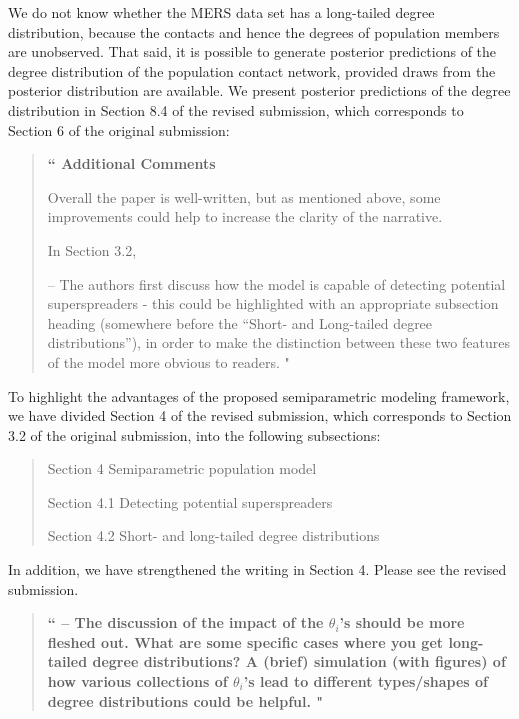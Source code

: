 \documentclass[12pt]{article}
\renewcommand{\=}{&=&}
\renewcommand{\bbq}{\vspace{.05cm}\begin{quote}\bf``}
\renewcommand{\ebq}{\hspace{-.15cm}"\end{quote}}
\newcommand{\bauthq}{\vspace{.05cm}\begin{quote}\em}
\newcommand{\eauthq}{\hspace{-.25cm}\end{quote}}
\renewcommand{\=}{&=&}
\begin{document}
We do not know whether the MERS data set has a long-tailed degree distribution,
because the contacts and hence the degrees of population members are unobserved.
That said,
it is possible to generate posterior predictions of the degree distribution of the population contact network,
provided draws from the posterior distribution are available.
We present posterior predictions of the degree distribution in Section 8.4 of the revised submission,
which corresponds to Section 6 of the original submission:
\bauthq\eauthq

\vspace{-.25cm}

\bbq
Additional Comments

Overall the paper is well-written, but as mentioned above, some improvements could help to increase the clarity of the narrative.

In Section 3.2,

– The authors first discuss how the model is capable of detecting potential superspreaders - this could be highlighted with an appropriate subsection heading (somewhere before the “Short- and Long-tailed degree distributions”), in order to make the distinction between these two features of the model more obvious to readers.
\ebq

To highlight the advantages of the proposed semiparametric modeling framework,
we have divided Section 4 of the revised submission,
which corresponds to Section 3.2 of the original submission,
into the following subsections:
\bauthq
\bi
\item[] Section 4 Semiparametric population model
\bi
\item[] Section 4.1 Detecting potential superspreaders
\item[] Section 4.2 Short- and long-tailed degree distributions
\ei
\ei
\eauthq
In addition, 
we have strengthened the writing in Section 4.
Please see the revised submission.

\bbq
– The discussion of the impact of the $\theta_i$’s should be more fleshed out. What are some specific cases where you get long-tailed degree distributions? A (brief) simulation (with figures) of how various collections of $\theta_i$’s lead to different types/shapes of degree distributions could be helpful.
\ebq
\end{document}

